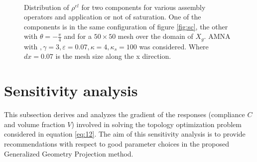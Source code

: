 \begin{figure}[!ht]
    \quad
    \\
    \quad
    \caption{Distribution of $ \rho^{el}$  for two components for various assembly operators and application or not of saturation. One of the components is in the same configuration of figure \ref{fig:sc}, the other with $\theta=-\frac{\pi}{4}$ and for a $50\times50$ mesh over the domain of $X_g$.  AMNA with $, \gamma=3, \varepsilon=0.07, \kappa=4, \kappa_s=100$ was considered. Where $dx=0.07$ is the mesh size along the x direction.\label{fig:asbly}}%
\end{figure}
\clearpage
\section{Sensitivity analysis}
\label{SA}
This subsection derives and analyzes the gradient of the responses (compliance $C$ and volume fraction $V$) involved in solving the topology optimization problem considered in equation \eqref{eq:12}. The aim of this sensitivity analysis is to provide recommendations with respect to good parameter choices in the proposed Generalized Geometry Projection method. 

